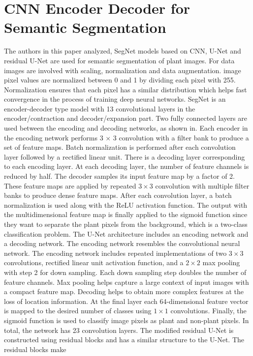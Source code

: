 \section{CNN Encoder Decoder for Semantic Segmentation}
The authors in this paper analyzed, SegNet models based on CNN, U-Net and residual U-Net are used for semantic segmentation of plant images. For data images are involved
with scaling, normalization and data augmentation. image pixel values are normalized between 0 and 1 by dividing each pixel with 255. Normalization ensures that each pixel
has a similar distribution which helps fast convergence in the process of training deep neural networks. SegNet is an encoder-decoder type model with 13 convolutional
layers in the encoder/contraction and decoder/expansion part. Two fully connected layers are used between the encoding and decoding networks, as shown in. Each encoder
in the encoding network performs 3 × 3 convolution with a filter bank to produce a set of feature maps. Batch normalization is performed after each convolution layer
followed by a rectified linear unit. There is a decoding layer corresponding to each encoding layer. At each decoding layer, the number of feature channels is reduced
by half. The decoder samples its input feature map by a factor of 2. These feature maps are applied by repeated $3 \times 3$ convolution with multiple filter banks to produce
dense feature maps. After each convolution layer, a batch normalization is used along with the ReLU activation function. The output with the multidimensional feature
map is finally applied to the sigmoid function since they want to separate the plant pixels from the background, which is a two-class classification problem. The U-Net
architecture includes an encoding network and a decoding network. The encoding network resembles the convolutional neural network. The encoding network includes
repeated implementations of two $3 \times 3$ convolutions, rectified linear unit activation function, and a $2 \times 2$ max pooling with step
2 for down sampling. Each down sampling step doubles the number of feature channels. Max pooling helps capture a large context of input images with a
compact feature map. Decoding helps to obtain more complex features at the loss of location information. At the final layer each 64-dimensional feature vector is mapped
to the desired number of classes using $1 \times 1$ convolutions. Finally, the sigmoid function is used to classify image pixels as plant and non-plant pixels. In total, the
network has 23 convolution layers. The modified residual U-Net is constructed using residual blocks and has a similar structure to the U-Net. The residual blocks make
